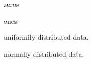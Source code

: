 \begin{methodbox}{}\leavevmode
    zeros
\end{methodbox}
\begin{methodbox}{}\leavevmode
    ones
\end{methodbox}
\begin{methodbox}{}\leavevmode
    uniformily distributed data.
\end{methodbox}
\begin{methodbox}{}\leavevmode
    normally distributed data.
\end{methodbox}


